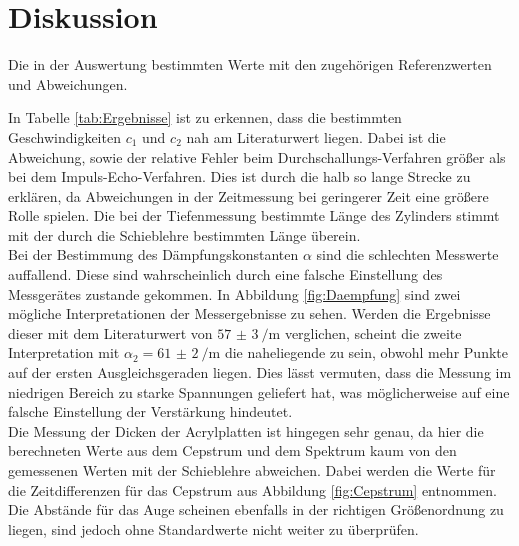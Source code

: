 
\section{Diskussion}
\label{sec:Diskussion}

\begin{table}
	\centering
	\caption{Die in der Auswertung bestimmten Werte mit den zugehörigen Referenzwerten und Abweichungen.}
	
	\label{tab:Ergebnisse}
\end{table}

\noindent In Tabelle \ref{tab:Ergebnisse} ist zu erkennen, dass die bestimmten Geschwindigkeiten $c_1$ und $c_2$ nah am Literaturwert liegen. Dabei ist die Abweichung, sowie der relative Fehler beim Durchschallungs-Verfahren größer als bei dem Impuls-Echo-Verfahren. Dies ist durch die halb so lange Strecke zu erklären, da Abweichungen in der Zeitmessung bei geringerer Zeit eine größere Rolle spielen. Die bei der Tiefenmessung bestimmte Länge des Zylinders stimmt mit der durch die Schieblehre bestimmten Länge überein.\\
Bei der Bestimmung des Dämpfungskonstanten $\alpha$ sind die schlechten Messwerte auffallend. Diese sind wahrscheinlich durch eine falsche Einstellung des Messgerätes zustande gekommen. In Abbildung \ref{fig:Daempfung} sind zwei mögliche Interpretationen der Messergebnisse zu sehen. Werden die Ergebnisse dieser mit dem Literaturwert von $\SI{57(3)}{\per\metre}$ verglichen, scheint die zweite Interpretation mit $\alpha_2=\SI{61(2)}{\per\metre}$ die naheliegende zu sein, obwohl mehr Punkte auf der ersten Ausgleichsgeraden liegen. Dies lässt vermuten, dass die Messung im niedrigen Bereich zu starke Spannungen geliefert hat, was möglicherweise auf eine falsche Einstellung der Verstärkung hindeutet.\\
Die Messung der Dicken der Acrylplatten ist hingegen sehr genau, da hier die berechneten Werte aus dem Cepstrum und dem Spektrum kaum von den gemessenen Werten mit der Schieblehre abweichen. Dabei werden die Werte für die Zeitdifferenzen für das Cepstrum aus Abbildung \ref{fig:Cepstrum} entnommen. Die Abstände für das Auge scheinen ebenfalls in der richtigen Größenordnung zu liegen, sind jedoch ohne Standardwerte nicht weiter zu überprüfen.     